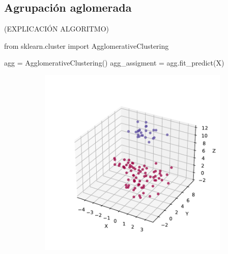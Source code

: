 
\newpage
\subsection{Agrupación aglomerada}
(EXPLICACIÓN ALGORITMO)

\begin{mypython}[float={h},caption={Agrupación aglomerada.}]
  from sklearn.cluster import AgglomerativeClustering

  agg = AgglomerativeClustering()
  agg_assigment = agg.fit_predict(X)
\end{mypython}

\begin{figure}[h]
  \centering
  \begin{subfigure}{0.45\textwidth}
    \centering
    \includegraphics[width=\textwidth]{figures/agglomerative-3d.pdf}
    \caption{}
    \label{fig:}
  \end{subfigure}
  \begin{subfigure}{0.45\textwidth}
    \centering

\end{subfigure}
\end{figure}
